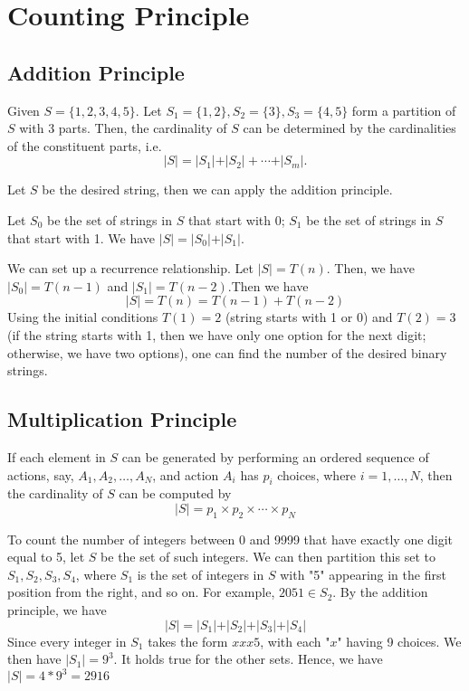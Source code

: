 \section{Counting Principle}
\subsection{Addition Principle}
Given \(S = \{1, 2, 3, 4, 5\}\). Let \(S_1 = \{1, 2\}, S_2 = \{3\}, S_3 = \{4, 5\}\) form a partition of \(S\) with 3 parts. Then, the cardinality of \(S\) can be determined by the cardinalities of the constituent parts, i.e. 
\[
    \vert S \vert = \vert S_1 \vert + \vert S_2 \vert + \cdots + \vert S_m \vert. 
\]

\begin{eg}

    Let \(S\) be the desired string, then we can apply the addition principle.

    Let \(S_0\) be the set of strings in \(S\) that start with 0; \(S_1\) be the set of strings in \(S\) that start with 1. We have \(\vert S \vert = \vert S_0 \vert + \vert S_1 \vert\).

    We can set up a recurrence relationship. Let \(\vert S \vert = T(n)\). Then, we have \(\vert S_0 \vert = T(n - 1)\) and \(\vert S_1 \vert = T(n - 2)\).Then we have 
    \[
        \vert S \vert = T(n) = T(n - 1) + T(n - 2)
    \]
    Using the initial conditions \(T(1) = 2\) (string starts with 1 or 0) and \(T(2) = 3\) (if the string starts with 1, then we have only one option for the next digit; otherwise, we have two options), one can find the number of the desired binary strings. 
\end{eg}

\subsection{Multiplication Principle}
If each element in \(S\) can be generated by performing an ordered sequence of actions, say, \(A_1, A_2, \dots, A_N\), and action \(A_i\) has \(p_i\) choices, where \(i = 1, \dots, N\), then the cardinality of \(S\) can be computed by
\[
    \vert S \vert = p_1 \times p_2 \times \cdots \times p_N
\] 

\begin{eg}
    To count the number of integers between 0 and 9999 that have exactly one digit equal to 5, let \(S\) be the set of such integers. We can then partition this set to \(S_1, S_2, S_3, S_4\),  where \(S_1\) is the set of integers in \(S\) with "5" appearing in the first position from the right, and so on. For example, \(2051 \in S_2\). By the addition principle, we have
    \[
        \vert S \vert = \vert S_1 \vert + \vert S_2 \vert + \vert S_3 \vert + \vert S_4 \vert 
    \]
    Since every integer in \(S_1\) takes the form \(xxx5\), with each "\(x\)" having 9 choices. We then have \(\vert S_1 \vert = 9^3\). It holds true for the other sets. Hence, we have \(\vert S \vert = 4 * 9^3 = 2916\)
\end{eg}

